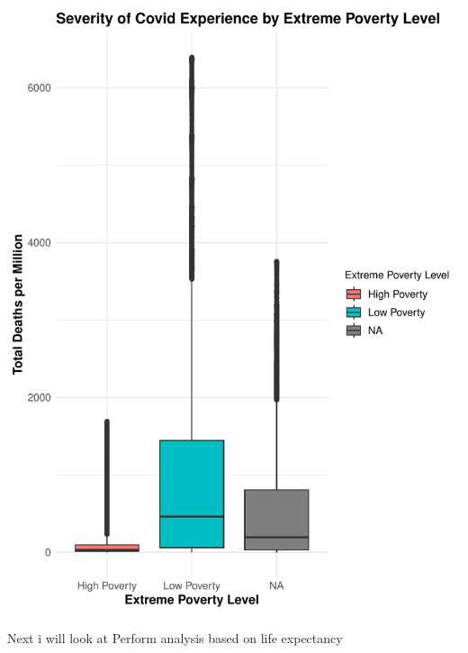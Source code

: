\documentclass[12pt,preprint, authoryear]{elsarticle}
\let\origfigure\figure
\let\endorigfigure\endfigure
\renewenvironment{figure}[1][2] {
    \expandafter\origfigure\expandafter[H]
} {
    \endorigfigure
}
\numberwithin{equation}{section}
\numberwithin{figure}{section}
\numberwithin{table}{section}
\begin{document}
\begin{figure}[H]

{\centering \includegraphics{Q1_files/figure-latex/Figure9-1} 

}

\caption{ Extreme poverty  \label{Figure9 }}\label{fig:Figure9}
\end{figure}

Next i will look at Perform analysis based on life expectancy
\end{document}
